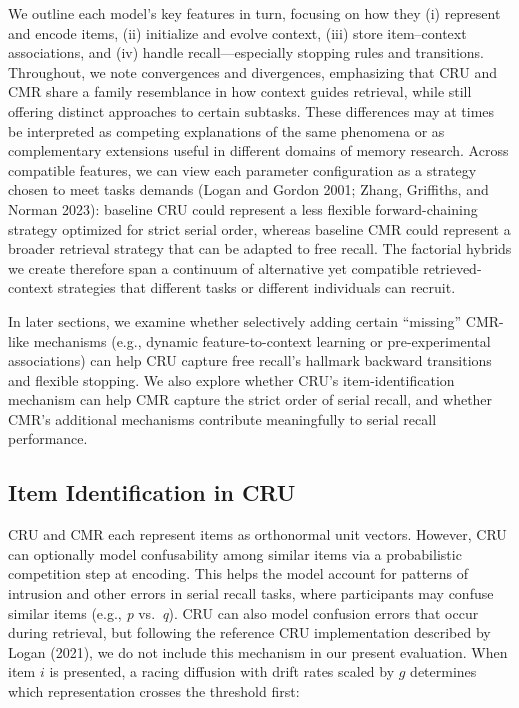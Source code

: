 \documentclass[
  letterpaper,
  DIV=11,
  numbers=noendperiod]{scrartcl}
\begin{document}
We outline each model's key features in turn, focusing on how they (i)
represent and encode items, (ii) initialize and evolve context, (iii)
store item--context associations, and (iv) handle recall---especially
stopping rules and transitions. Throughout, we note convergences and
divergences, emphasizing that CRU and CMR share a family resemblance in
how context guides retrieval, while still offering distinct approaches
to certain subtasks. These differences may at times be interpreted as
competing explanations of the same phenomena or as complementary
extensions useful in different domains of memory research. Across
compatible features, we can view each parameter configuration as a
strategy chosen to meet tasks demands (Logan and Gordon 2001; Zhang,
Griffiths, and Norman 2023): baseline CRU could represent a less
flexible forward-chaining strategy optimized for strict serial order,
whereas baseline CMR could represent a broader retrieval strategy that
can be adapted to free recall. The factorial hybrids we create therefore
span a continuum of alternative yet compatible retrieved-context
strategies that different tasks or different individuals can recruit.

In later sections, we examine whether selectively adding certain
``missing'' CMR-like mechanisms (e.g., dynamic feature-to-context
learning or pre-experimental associations) can help CRU capture free
recall's hallmark backward transitions and flexible stopping. We also
explore whether CRU's item-identification mechanism can help CMR capture
the strict order of serial recall, and whether CMR's additional
mechanisms contribute meaningfully to serial recall performance.

\subsection{Item Identification in
CRU}\label{item-identification-in-cru}

CRU and CMR each represent items as orthonormal unit vectors. However,
CRU can optionally model confusability among similar items via a
probabilistic competition step at encoding. This helps the model account
for patterns of intrusion and other errors in serial recall tasks, where
participants may confuse similar items (e.g., \emph{p} vs.~\emph{q}).
CRU can also model confusion errors that occur during retrieval, but
following the reference CRU implementation described by Logan (2021), we
do not include this mechanism in our present evaluation. When item \(i\)
is presented, a racing diffusion with drift rates scaled by \(g\)
determines which representation crosses the threshold first:
\end{document}

